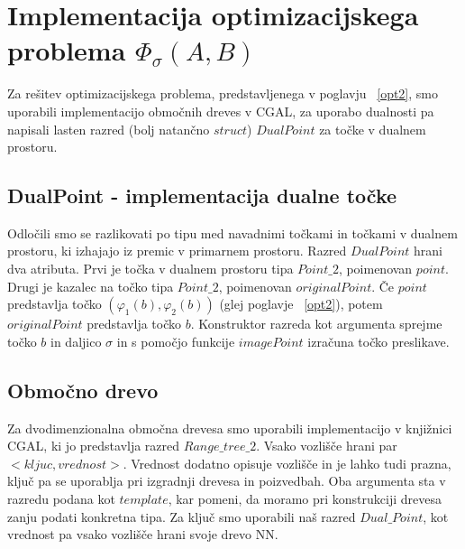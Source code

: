 \documentclass[a4paper, 12pt]{book}
\begin{document}
\section{Implementacija optimizacijskega problema $\Phi_\sigma(A,B)$}

Za rešitev optimizacijskega problema, predstavljenega v poglavju ~\ref{opt2}, smo uporabili implementacijo območnih dreves v CGAL, za uporabo dualnosti pa napisali lasten razred (bolj natančno $struct$) $DualPoint$ za točke v dualnem prostoru.

\subsection{DualPoint - implementacija dualne točke}

Odločili smo se razlikovati po tipu med navadnimi točkami in točkami v dualnem prostoru, ki izhajajo iz premic v primarnem prostoru. Razred $DualPoint$ hrani dva atributa. Prvi je točka v dualnem prostoru tipa $Point\texttt{\_}2$, poimenovan $point$. Drugi je kazalec na točko tipa $Point\texttt{\_}2$, poimenovan $originalPoint$. Če $point$ predstavlja točko $(\varphi_1(b), \varphi_2(b))$ (glej poglavje ~\ref{opt2}), potem $originalPoint$ predstavlja točko $b$. Konstruktor razreda kot argumenta sprejme točko $b$ in daljico $\sigma$ in s pomočjo funkcije $imagePoint$ izračuna točko preslikave.


\subsection{Območno drevo}
Za dvodimenzionalna območna drevesa smo uporabili implementacijo v knjižnici CGAL, ki jo predstavlja razred $Range\texttt{\_}tree\texttt{\_}2$. Vsako vozlišče hrani par $<kljuc, vrednost>$. Vrednost dodatno opisuje vozlišče in je lahko tudi prazna, ključ pa se uporablja pri izgradnji drevesa in poizvedbah. Oba argumenta sta v razredu podana kot $template$, kar pomeni, da moramo pri konstrukciji drevesa zanju podati konkretna tipa. 
Za ključ smo uporabili naš razred $Dual\texttt{\_}Point$, kot vrednost pa vsako vozlišče hrani svoje drevo NN.
\end{document}
